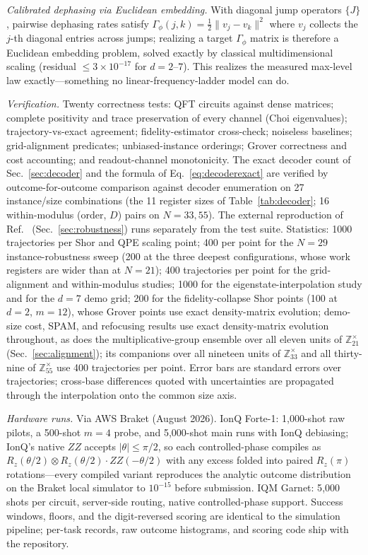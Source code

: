 \documentclass[aps,pra,reprint,superscriptaddress,nofootinbib,floatfix]{revtex4-2}
\begin{document}
\emph{Calibrated dephasing via Euclidean embedding.} With diagonal jump
operators $\{J\}$, pairwise dephasing rates satisfy
$\Gamma_\phi(j,k)=\tfrac12\lVert v_j-v_k\rVert^2$ where $v_j$ collects
the $j$-th diagonal entries across jumps; realizing a target
$\Gamma_\phi$ matrix is therefore a Euclidean embedding problem, solved
exactly by classical multidimensional scaling (residual
$\le3\times10^{-17}$ for $d=2$--$7$). This realizes the measured
max-level law exactly---something no linear-frequency-ladder model can
do.

\emph{Verification.} Twenty correctness tests: QFT circuits against
dense matrices; complete positivity and trace preservation of every
channel (Choi eigenvalues); trajectory-vs-exact agreement;
fidelity-estimator cross-check; noiseless baselines; grid-alignment
predicates; unbiased-instance orderings; Grover correctness and cost
accounting; and readout-channel monotonicity. The exact decoder count of
Sec.~\ref{sec:decoder} and the formula of Eq.~\eqref{eq:decoderexact}
are verified by outcome-for-outcome comparison against decoder
enumeration on 27 instance/size combinations (the 11 register sizes
of Table~\ref{tab:decoder}; 16 within-modulus (order, $D$) pairs on
$N=33,55$). The external
reproduction of Ref.~\cite{jankovic2024}
(Sec.~\ref{sec:robustness}) runs separately from the test suite.
Statistics: 1000 trajectories per Shor and QPE scaling point;
400 per point for the $N=29$ instance-robustness
sweep (200 at the three deepest configurations, whose work registers
are wider than at $N=21$); 400 trajectories per point for the grid-alignment
and within-modulus studies; 1000 for the eigenstate-interpolation
study and for the $d=7$ demo grid; 200 for the fidelity-collapse Shor
points (100 at $d{=}2$,
$m{=}12$), whose Grover points use exact density-matrix evolution;
demo-size cost, SPAM, and refocusing results use exact density-matrix
evolution throughout, as does the multiplicative-group ensemble over
all eleven units of $\mathbb{Z}_{21}^{\times}$
(Sec.~\ref{sec:alignment}); its companions over all nineteen units
of $\mathbb{Z}_{33}^{\times}$ and all thirty-nine of
$\mathbb{Z}_{55}^{\times}$ use 400 trajectories per point. Error bars are standard errors over
trajectories; cross-base differences quoted with uncertainties are
propagated through the interpolation onto the common size axis.

\emph{Hardware runs.} Via AWS Braket (August 2026). IonQ Forte-1:
1{,}000-shot raw pilots, a 500-shot $m=4$ probe, and 5{,}000-shot main
runs with IonQ debiasing; IonQ's native $ZZ$ accepts
$\lvert\theta\rvert\le\pi/2$, so each controlled-phase compiles as
$R_z(\theta/2)\otimes R_z(\theta/2)\cdot ZZ(-\theta/2)$ with any
excess folded into paired $R_z(\pi)$ rotations---every compiled
variant reproduces the analytic outcome distribution on the Braket
local simulator to $10^{-15}$ before submission. IQM Garnet:
5{,}000 shots per circuit, server-side routing, native
controlled-phase support. Success windows, floors, and the
digit-reversed scoring are identical to the simulation pipeline;
per-task records, raw outcome histograms, and scoring code ship with
the repository.
\end{document}

